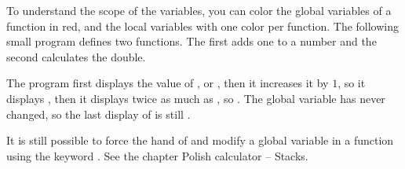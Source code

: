 \documentclass[11pt,class=report,crop=false]{standalone}
\begin{document}
\begin{cours}
\begin{itemize}
\end{itemize}


To understand the scope of the variables, you can color the global variables of a function in red, and the local variables with one color per function.
The following small program defines two functions. The first adds one to a number and the second calculates the double.


The program first displays the value of , or , then it increases it by $1$, so it displays , then it displays twice as much as , so . The global variable  has never changed, so the last display of  is still .

\bigskip

It is still possible to force the hand of \Python{} and modify a global variable in a function using the keyword . See the chapter \og{}Polish calculator -- Stacks\fg{}.

\end{cours}
\end{document}
